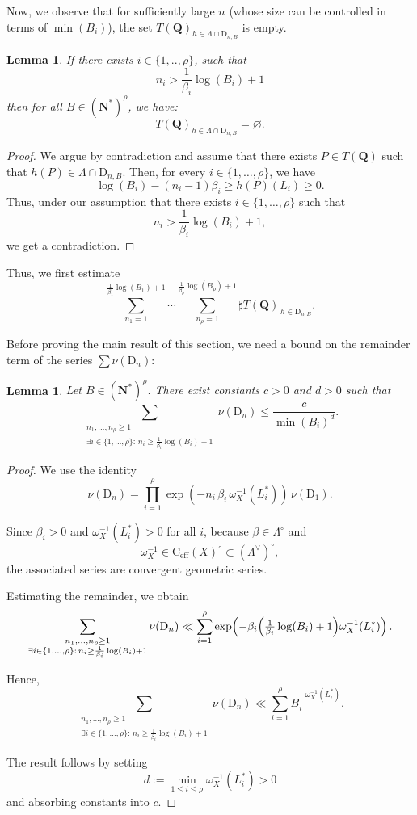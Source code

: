 \documentclass{proc-l}
\newcommand{\N}{\mathbf{N}}
\newcommand{\Q}{\mathbf{Q}}
\newcommand{\cone}{\text{C}_{\text{eff}}(X)}
\newcommand{\w}{\omega}
\newtheorem{lemma}[theorem]{Lemma}
\theoremstyle{definition}
\theoremstyle{remark}
\numberwithin{equation}{section}
\begin{document}
Now, we observe that for sufficiently large $n$ (whose size can be controlled in terms of $\min(B_i)$), the set $T(\Q)_{h \in \Lambda \cap \mathrm{D}_{n,B}}$ is empty.

\begin{lemma}\label{lemma_n_assez_grand_ensemble_vide}
If there exists $i \in \{1,..,\rho\}$, such that $$n_i > \frac{1}{\beta_i}\log(B_i) + 1$$then for all $B \in (\N^*)^{\rho}$, we have: 
$$T(\Q)_{h \in \Lambda \cap \mathrm{D}_{n,B}} = \varnothing.$$
\end{lemma}

\begin{proof}
We argue by contradiction and assume that there exists $P \in T(\Q)$ such that $h(P) \in \Lambda \cap \mathrm{D}_{n,B}$. Then, for every $i \in \{1,\dots,\rho\}$, we have
\[
\log(B_i) - (n_i - 1)\beta_i \geqslant h(P)(L_i) \geqslant 0.
\]
Thus, under our assumption that there exists $i \in \{1,\dots,\rho\}$ such that
\[
n_i > \frac{1}{\beta_i}\log(B_i) + 1,
\]
we get a contradiction.
\end{proof}


Thus, we first estimate
\[
\sum_{n_1 = 1}^{\frac{1}{\beta_1}\log(B_1) + 1}
\cdots
\sum_{n_{\rho} = 1}^{\frac{1}{\beta_{\rho}}\log(B_{\rho}) + 1}
\sharp T(\Q)_{\,h \in \mathrm{D}_{n,B}}.
\]


Before proving the main result of this section, we need a bound on the remainder term of the series $\sum \nu(\mathrm{D}_n)$:

\begin{lemma}\label{lemma_majoration_reste_serie}
Let $B \in (\mathbf{N}^*)^{\rho}$. There exist constants $c>0$ and $d>0$ such that
\[
\sum_{\substack{n_1,\dots,n_\rho \ge 1\\ \exists i\in\{1,\dots,\rho\}:\,
n_i \ge \frac{1}{\beta_i}\log(B_i)+1}}
\nu(\mathrm{D}_n)
\le
\frac{c}{\min(B_i)^d}.
\]
\end{lemma}

\begin{proof}
We use the identity
\[
\nu(\mathrm{D}_n)
=
\prod_{i=1}^{\rho}
\exp\!\left(-n_i\,\beta_i\,\w_X^{-1}(L_i^*)\right)
\,\nu(\mathrm{D}_1).
\]

Since $\beta_i>0$ and $\w_X^{-1}(L_i^*)>0$ for all $i$, because
$\beta\in\Lambda^{\circ}$ and $$\w_X^{-1}\in\cone^{\circ}\subset(\Lambda^\vee)^{\circ},$$the associated series are convergent geometric series.

Estimating the remainder, we obtain
\[
\sum_{\substack{n_1,\dots,n_\rho \ge 1\\ \exists i\in\{1,\dots,\rho\}:\,
n_i \ge \frac{1}{\beta_i}\log(B_i)+1}}
\nu(\mathrm{D}_n)
\ll
\sum_{i=1}^{\rho}
\exp\!\left(-\beta_i\Bigl(\tfrac{1}{\beta_i}\log(B_i)+1\Bigr)\w_X^{-1}(L_i^*)\right).
\]

Hence,
\[
\sum_{\substack{n_1,\dots,n_\rho \ge 1\\ \exists i\in\{1,\dots,\rho\}:\,
n_i \ge \frac{1}{\beta_i}\log(B_i)+1}}
\nu(\mathrm{D}_n)
\ll
\sum_{i=1}^{\rho}
B_i^{-\w_X^{-1}(L_i^*)}.
\]

The result follows by setting
$$
d := \min_{1\le i\le \rho} \w_X^{-1}(L_i^*) > 0$$and absorbing constants into $c$.
\end{proof}
\end{document}
